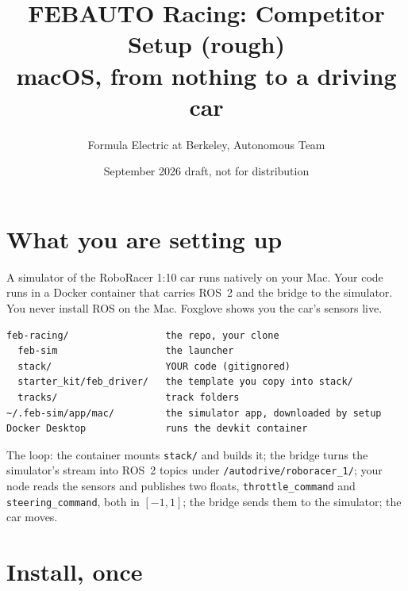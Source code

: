 \documentclass[11pt,a4paper]{article}
\title{\color{febblue}\LARGE FEBAUTO Racing: Competitor Setup (rough)\\[4pt]\large macOS, from nothing to a driving car}
\author{Formula Electric at Berkeley, Autonomous Team}
\date{September 2026 \quad\textperiodcentered\quad draft, not for distribution}
\begin{document}
\maketitle

\section*{What you are setting up}

A simulator of the RoboRacer 1:10 car runs natively on your Mac. Your code runs in a Docker
container that carries ROS~2 and the bridge to the simulator. You never install ROS on the
Mac. Foxglove shows you the car's sensors live.

\begin{lstlisting}
feb-racing/                 the repo, your clone
  feb-sim                   the launcher
  stack/                    YOUR code (gitignored)
  starter_kit/feb_driver/   the template you copy into stack/
  tracks/                   track folders
~/.feb-sim/app/mac/         the simulator app, downloaded by setup
Docker Desktop              runs the devkit container
\end{lstlisting}

The loop: the container mounts \texttt{stack/} and builds it; the bridge turns the simulator's
stream into ROS~2 topics under \texttt{/autodrive/roboracer\_1/}; your node reads the sensors
and publishes two floats, \texttt{throttle\_command} and \texttt{steering\_command}, both in
$[-1, 1]$; the bridge sends them to the simulator; the car moves.

\section{Install, once}
\end{document}
